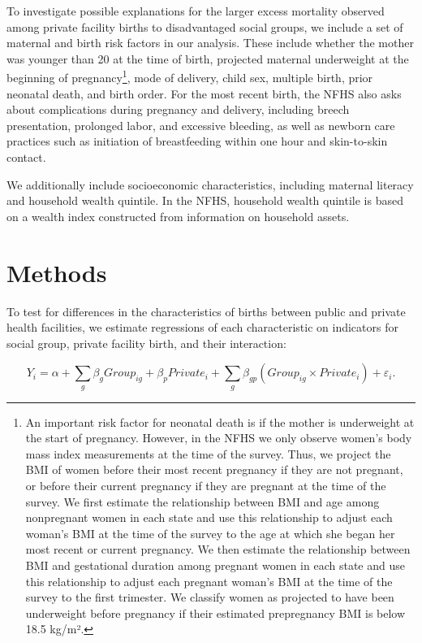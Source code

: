 \documentclass[12pt]{article}
\begin{document}
To investigate possible explanations for the larger excess mortality observed among private facility births to disadvantaged social groups, we include a set of maternal and birth risk factors in our analysis. These include whether the mother was younger than 20 at the time of birth, projected maternal underweight at the beginning of pregnancy\footnote{An important risk factor for neonatal death is if the mother is underweight at the start of pregnancy. However, in the NFHS we only observe women's body mass index measurements at the time of the survey. Thus, we project the BMI of women before their most recent pregnancy if they are not pregnant, or before their current pregnancy if they are pregnant at the time of the survey. We first estimate the relationship between BMI and age among nonpregnant women in each state and use this relationship to adjust each woman’s BMI at the time of the survey to the age at which she began her most recent or current pregnancy. We then estimate the relationship between BMI and gestational duration among pregnant women in each state and use this relationship to adjust each pregnant woman's BMI at the time of the survey to the first trimester. We classify women as projected to have been underweight before pregnancy if their estimated prepregnancy BMI is below 18.5 kg/m².}, mode of delivery, child sex, multiple birth, prior neonatal death, and birth order. For the most recent birth, the NFHS also asks about complications during pregnancy and delivery, including breech presentation, prolonged labor, and excessive bleeding, as well as newborn care practices such as initiation of breastfeeding within one hour and skin-to-skin contact.

We additionally include socioeconomic characteristics, including maternal literacy and household wealth quintile. In the NFHS, household wealth quintile is based on a wealth index constructed from information on household assets.



\section{Methods}

To test for differences in the characteristics of births between public and private health facilities, we estimate regressions of each characteristic on indicators for social group, private facility birth, and their interaction:

\begin{equation}
Y_i = \alpha + \sum_g \beta_g Group_{ig}
+ \beta_p Private_i
+ \sum_g \beta_{gp}(Group_{ig} \times Private_i)
+ \varepsilon_i.
\end{equation}
\end{document}
